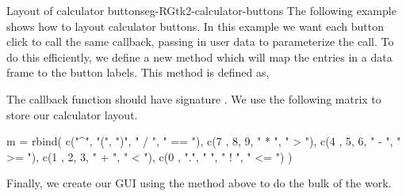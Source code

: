 \begin{example}{Layout of calculator buttons}{eg-RGtk2-calculator-buttons}
  The following example shows how to layout calculator buttons. In
  this example we want each button click to call the same callback,
  passing in user data to parameterize the call.  To do this
  efficiently, we define a new method
   which will map the entries
  in a data frame to the button labels. This method is defined as,
\begin{Schunk}
\end{Schunk}
The callback function should have signature
. We use the following matrix to store our
calculator layout.
\begin{Schunk}
\begin{Sinput}
 m = rbind(
   c("^", "(", ")", " / ", " == "),
   c(7  ,   8,   9, " * ", " > "),
   c(4  ,   5,   6, " - ", " >= "),
   c(1  ,   2,   3, " + ", " < "),
   c(0  , ".", " ", " ! ", " <= ")
   )
\end{Sinput}
\end{Schunk}
Finally, we create our GUI using the method above to do the bulk of
the work.
\begin{Schunk}
\end{Schunk}
\end{example}


